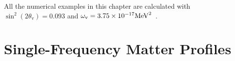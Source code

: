 All the numerical examples in this chapter are calculated with $\sin^2(2\theta_{\mathrm v}) = 0.093$ and $\omega_{\mathrm v} = 3.75\times 10^{-17}\mathrm{MeV}^2$~\cite{Patrignani:2016xqp}.






\section{\label{chap:matter-sec:single}Single-Frequency Matter Profiles}%








